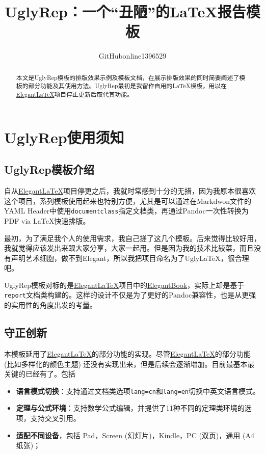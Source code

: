 \documentclass[12pt, textbook]{uglyrep}
\title{\bfseries UglyRep：一个“丑陋”的\LaTeX{}报告模板}
\author{GitHubonline1396529}
\date{\zhdate{2022/12/31}}
\begin{document}
\maketitle
\begin{abstract}
  本文是UglyRep模板的排版效果示例及模板文档，在展示排版效果的同时简要阐述了模板的部分功能及其使用方法。UglyRep最初是我留作自用的\LaTeX 模板，用以在\href{https://github.com/ElegantLaTeX/}{Elegant\LaTeX}项目停止更新后取代其功能。

\end{abstract}

\tableofcontents

\chapter{UglyRep使用须知}

\section{UglyRep模板介绍}

自从\href{https://github.com/ElegantLaTeX/}{Elegant\LaTeX}项目停更之后，我就时常感到十分的无措，因为我原本很喜欢这个项目，系列模板使用起来也特别方便，尤其是可以通过在Markdwon文件的YAML Header中使用\texttt{documentclass}指定文档类，再通过Pandoc一次性转换为PDF via \LaTeX{}快速排版。

最初，为了满足我个人的使用需求，我自己搓了这几个模板。后来觉得比较好用，我就觉得应该发出来跟大家分享，大家一起用。但是因为我的技术比较菜，而且没有声明艺术细胞，做不到Elegant，所以我把项目命名为了Ugly\LaTeX{}，很合理吧。

UglyRep模板对标的是\href{https://github.com/ElegantLaTeX/}{Elegant\LaTeX}项目中的\href{https://github.com/ElegantLaTeX/ElegantBook}{ElegantBook}，实际上却是基于\texttt{report}文档类构建的。这样的设计不仅是为了更好的Pandoc兼容性，也是从更强的实用性的角度出发的考量。

\section{守正创新}

本模板延用了\href{https://github.com/ElegantLaTeX/}{Elegant\LaTeX}的部分功能的实现。尽管\href{https://github.com/ElegantLaTeX/}{Elegant\LaTeX}的部分功能 (比如多样化的颜色主题) 还没有实现出来，但是后续会逐渐增加。目前最基本最关键的已经有了。包括
\begin{itemize}
  \item \textbf{语言模式切换}：支持通过文档类选项\texttt{lang=cn}和\texttt{lang=en}切换中英文语言模式。
  \item \textbf{定理与公式环境}：支持数学公式编辑，并提供了11种不同的定理类环境的选项，支持交叉引用。
  \item \textbf{适配不同设备}，包括 Pad，Screen (幻灯片)，Kindle，PC (双页)，通用 (A4 纸张)；
\end{itemize}
\end{document}
